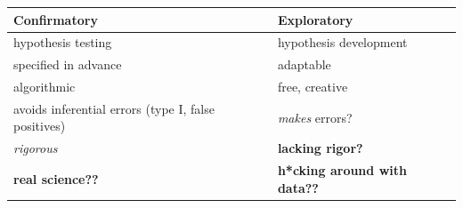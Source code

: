 \documentclass[
]{article}
\begin{document}
\begin{longtable}[]{@{}ll@{}}
\toprule
\begin{minipage}[b]{0.42\columnwidth}\raggedright
Confirmatory\strut
\end{minipage} & \begin{minipage}[b]{0.29\columnwidth}\raggedright
Exploratory\strut
\end{minipage}\tabularnewline
\midrule
\endhead
\begin{minipage}[t]{0.42\columnwidth}\raggedright
hypothesis testing\strut
\end{minipage} & \begin{minipage}[t]{0.29\columnwidth}\raggedright
hypothesis development\strut
\end{minipage}\tabularnewline
\begin{minipage}[t]{0.42\columnwidth}\raggedright
specified in advance\strut
\end{minipage} & \begin{minipage}[t]{0.29\columnwidth}\raggedright
adaptable\strut
\end{minipage}\tabularnewline
\begin{minipage}[t]{0.42\columnwidth}\raggedright
algorithmic\strut
\end{minipage} & \begin{minipage}[t]{0.29\columnwidth}\raggedright
free, creative\strut
\end{minipage}\tabularnewline
\begin{minipage}[t]{0.42\columnwidth}\raggedright
avoids inferential errors
(type I, false positives)\strut
\end{minipage} & \begin{minipage}[t]{0.29\columnwidth}\raggedright
\emph{makes} errors?\strut
\end{minipage}\tabularnewline
\begin{minipage}[t]{0.42\columnwidth}\raggedright
\emph{rigorous}\strut
\end{minipage} & \begin{minipage}[t]{0.29\columnwidth}\raggedright
\textbf{lacking rigor?}\strut
\end{minipage}\tabularnewline
\begin{minipage}[t]{0.42\columnwidth}\raggedright
\textbf{real science??}\strut
\end{minipage} & \begin{minipage}[t]{0.29\columnwidth}\raggedright
\textbf{h*cking around with data??}\strut
\end{minipage}\tabularnewline
\bottomrule
\end{longtable}
\end{document}

